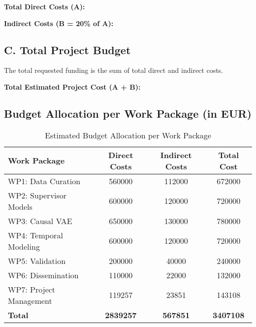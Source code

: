 \textbf{Total Direct Costs (A): }

\textbf{Indirect Costs (B = 20\% of A): }

\subsection*{C. Total Project Budget}
The total requested funding is the sum of total direct and indirect costs.

\textbf{Total Estimated Project Cost (A + B):} 

\subsection*{Budget Allocation per Work Package (in EUR)}

\begin{table}[H]
\centering
\caption{Estimated Budget Allocation per Work Package}
\label{tab:budget_wp}
\begin{tabular}{lS[table-format=7.0]S[table-format=7.0]S[table-format=7.0]}
\toprule
\textbf{Work Package} & {\textbf{Direct Costs}} & {\textbf{Indirect Costs}} & {\textbf{Total Cost}} \\
\midrule
WP1: Data Curation & 560000 & 112000 & 672000 \\
WP2: Supervisor Models & 600000 & 120000 & 720000 \\
WP3: Causal VAE & 650000 & 130000 & 780000 \\
WP4: Temporal Modeling & 600000 & 120000 & 720000 \\
WP5: Validation & 200000 & 40000 & 240000 \\
WP6: Dissemination & 110000 & 22000 & 132000 \\
WP7: Project Management & 119257 & 23851 & 143108 \\
\midrule
\textbf{Total} & {\textbf{2839257}} & {\textbf{567851}} & {\textbf{3407108}} \\
\bottomrule
\end{tabular}
\end{table}